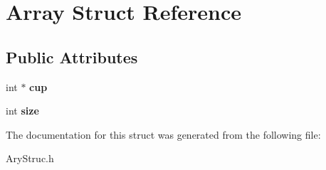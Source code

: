 \hypertarget{struct_array}{\section{Array Struct Reference}
\label{struct_array}
}
\subsection*{Public Attributes}
\begin{DoxyCompactItemize}
\item 
\hypertarget{struct_array_a80263e25ac3586c907c6982c0408a234}{int $\ast$ {\bfseries cup}}\label{struct_array_a80263e25ac3586c907c6982c0408a234}

\item 
\hypertarget{struct_array_a8780e83e6e49494e704a4304642e99ef}{int {\bfseries size}}\label{struct_array_a8780e83e6e49494e704a4304642e99ef}

\end{DoxyCompactItemize}


The documentation for this struct was generated from the following file\-:\begin{DoxyCompactItemize}
\item 
Ary\-Struc.\-h\end{DoxyCompactItemize}
